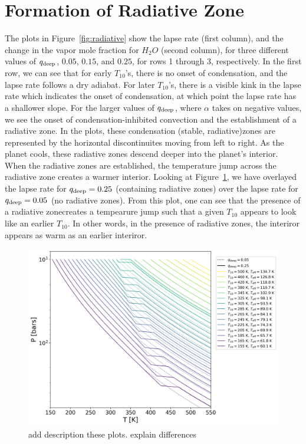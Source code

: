 \documentclass[11pt]{ucscthesisbs}
\begin{document}
\section{Formation of Radiative Zone}
The plots in Figure~\ref{fig:radiative} show the lapse rate (first column), and the change in the vapor mole fraction for $H_{2}O$ (second column), for three different values of $q_{\rm deep}$, $0.05$, $0.15$, and $0.25$, for rows 1 through 3, respectively. In the first row, we can see that for early $T_{10}$'s, there is no onset of condensation, and the lapse rate follows a dry adiabat. For later $T_{10}$'s, there is a visible kink in the lapse rate which indicates the onset of condensation, at which point the lapse rate has a shallower slope. For the larger values of $q_{\rm deep}$, where $\alpha$ takes on negative values, we see the onset of condensation-inhibited convection and the establishment of a radiative zone. In the plots, these condensation (stable, radiative)zones are represented by the horizontal discontinuites moving from left to right. As the planet cools, these radiative zones descend deeper into the planet's interior. When the radiative zones are established, the temperature jump across the radiative zone creates a warmer interior. Looking at Figure~\ref{fig:overlay}, we have overlayed the lapse rate for $q_{\rm deep} = 0.25$ (containing radiative zones) over the lapse rate for $q_{\rm deep}=0.05$ (no radiative zones). From this plot, one can see that the presence of a radiative zonecreates a tempearure jump such that a given $T_{10}$ appears to look like an earlier $T_{10}$. In other words, in the presence of radiative zones, the interiror appears as warm as an earlier interiror.

\begin{figure}[ht]
 \centerline{
  \includegraphics[scale=0.7]{figures/thesis_static_radiative_layer_plot_diff_qdeep_overlay.png}
 }
\caption[Inhibition of convection on Uranus]
{add description these plots. explain differences}
\label{fig:overlay}
\end{figure}
\end{document}
